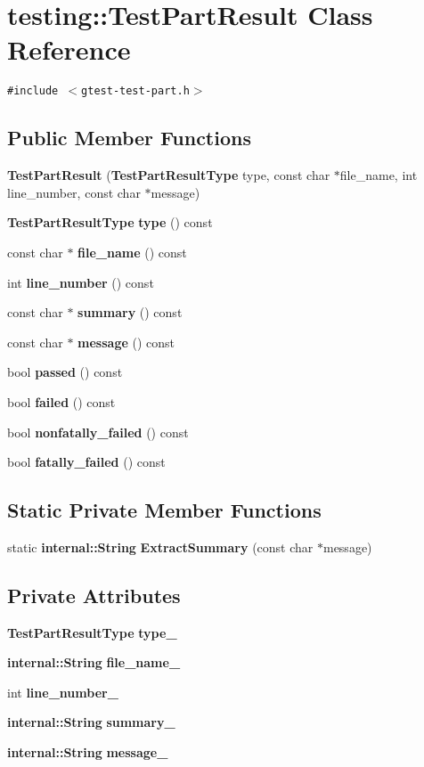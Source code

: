 \section{testing::TestPartResult Class Reference}
\label{classtesting_1_1TestPartResult}
{\tt \#include $<$gtest-test-part.h$>$}

\subsection*{Public Member Functions}
\begin{CompactItemize}
\item 
{\bf TestPartResult} ({\bf TestPartResultType} type, const char $\ast$file\_\-name, int line\_\-number, const char $\ast$message)
\item 
{\bf TestPartResultType} {\bf type} () const
\item 
const char $\ast$ {\bf file\_\-name} () const
\item 
int {\bf line\_\-number} () const
\item 
const char $\ast$ {\bf summary} () const
\item 
const char $\ast$ {\bf message} () const
\item 
bool {\bf passed} () const
\item 
bool {\bf failed} () const
\item 
bool {\bf nonfatally\_\-failed} () const
\item 
bool {\bf fatally\_\-failed} () const
\end{CompactItemize}
\subsection*{Static Private Member Functions}
\begin{CompactItemize}
\item 
static {\bf internal::String} {\bf ExtractSummary} (const char $\ast$message)
\end{CompactItemize}
\subsection*{Private Attributes}
\begin{CompactItemize}
\item 
{\bf TestPartResultType} {\bf type\_\-}
\item 
{\bf internal::String} {\bf file\_\-name\_\-}
\item 
int {\bf line\_\-number\_\-}
\item 
{\bf internal::String} {\bf summary\_\-}
\item 
{\bf internal::String} {\bf message\_\-}
\end{CompactItemize}


